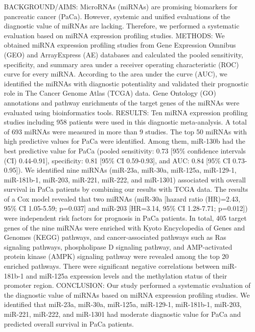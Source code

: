 \documentclass[]{article}
\begin{document}
BACKGROUND/AIMS: MicroRNAs (miRNAs) are promising biomarkers for
pancreatic cancer (PaCa). However, systemic and unified evaluations of
the diagnostic value of miRNAs are lacking. Therefore, we performed a
systematic evaluation based on miRNA expression profiling studies.
METHODS: We obtained miRNA expression profiling studies from Gene
Expression Omnibus (GEO) and ArrayExpress (AE) databases and calculated
the pooled sensitivity, specificity, and summary area under a receiver
operating characteristic (ROC) curve for every miRNA. According to the
area under the curve (AUC), we identified the miRNAs with diagnostic
potentiality and validated their prognostic role in The Cancer Genome
Atlas (TCGA) data. Gene Ontology (GO) annotations and pathway
enrichments of the target genes of the miRNAs were evaluated using
bioinformatics tools. RESULTS: Ten miRNA expression profiling studies
including 958 patients were used in this diagnostic meta-analysis. A
total of 693 miRNAs were measured in more than 9 studies. The top 50
miRNAs with high predictive values for PaCa were identified. Among them,
miR-130b had the best predictive value for PaCa (pooled sensitivity:
0.73 {[}95\% confidence intervals (CI) 0.44-0.91{]}, specificity: 0.81
{[}95\% CI 0.59-0.93{]}, and AUC: 0.84 {[}95\% CI 0.73-0.95{]}). We
identified nine miRNAs (miR-23a, miR-30a, miR-125a, miR-129-1,
miR-181b-1, miR-203, miR-221, miR-222, and miR-1301) associated with
overall survival in PaCa patients by combining our results with TCGA
data. The results of a Cox model revealed that two miRNAs (miR-30a
{[}hazard ratio (HR)=2.43, 95\% CI 1.05-5.59; p=0.037{]} and miR-203
{[}HR=3.14, 95\% CI 1.28-7.71; p=0.012{]}) were independent risk factors
for prognosis in PaCa patients. In total, 405 target genes of the nine
miRNAs were enriched with Kyoto Encyclopedia of Genes and Genomes (KEGG)
pathways, and cancer-associated pathways such as Ras signaling pathways,
phospholipase D signaling pathway, and AMP-activated protein kinase
(AMPK) signaling pathway were revealed among the top 20 enriched
pathways. There were significant negative correlations between
miR-181b-1 and miR-125a expression levels and the methylation status of
their promoter region. CONCLUSION: Our study performed a systematic
evaluation of the diagnostic value of miRNAs based on miRNA expression
profiling studies. We identified that miR-23a, miR-30a, miR-125a,
miR-129-1, miR-181b-1, miR-203, miR-221, miR-222, and miR-1301 had
moderate diagnostic value for PaCa and predicted overall survival in
PaCa patients.
\end{document}
